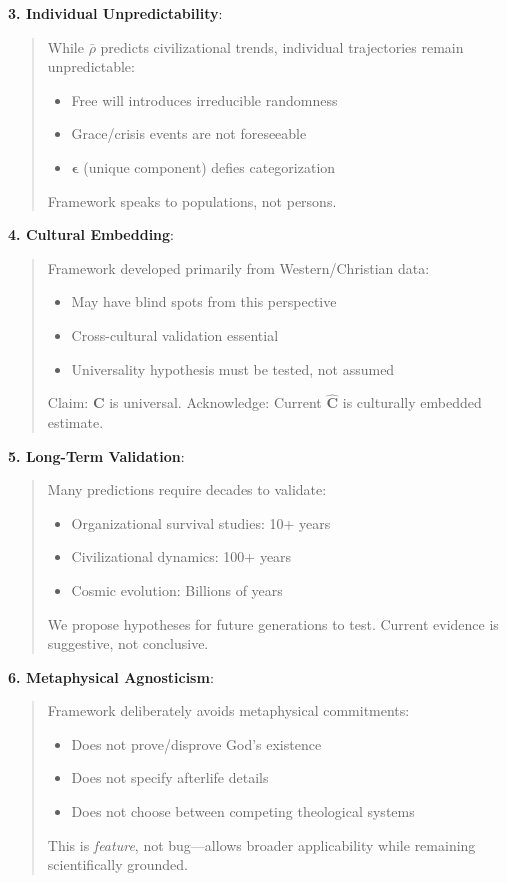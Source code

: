 \documentclass[11pt,a4paper]{article}
\theoremstyle{definition}
\theoremstyle{remark}
\begin{document}
\begin{enumerate}
\begin{protocol}
\begin{mdframed}[backgroundcolor=red!10,linewidth=2pt]
\textbf{3. Individual Unpredictability}:
\begin{quote}
While \(\bar{\rho}\) predicts civilizational trends, individual trajectories remain unpredictable:
\begin{itemize}[nosep]
    \item Free will introduces irreducible randomness
    \item Grace/crisis events are not foreseeable
    \item \(\boldsymbol{\epsilon}\) (unique component) defies categorization
\end{itemize}
Framework speaks to populations, not persons.
\end{quote}

\textbf{4. Cultural Embedding}:
\begin{quote}
Framework developed primarily from Western/Christian data:
\begin{itemize}[nosep]
    \item May have blind spots from this perspective
    \item Cross-cultural validation essential
    \item Universality hypothesis must be tested, not assumed
\end{itemize}
Claim: \(\mathbf{C}\) is universal. Acknowledge: Current \(\hat{\mathbf{C}}\) is culturally embedded estimate.
\end{quote}

\textbf{5. Long-Term Validation}:
\begin{quote}
Many predictions require decades to validate:
\begin{itemize}[nosep]
    \item Organizational survival studies: 10+ years
    \item Civilizational dynamics: 100+ years
    \item Cosmic evolution: Billions of years
\end{itemize}
We propose hypotheses for future generations to test. Current evidence is suggestive, not conclusive.
\end{quote}

\textbf{6. Metaphysical Agnosticism}:
\begin{quote}
Framework deliberately avoids metaphysical commitments:
\begin{itemize}[nosep]
    \item Does not prove/disprove God's existence
    \item Does not specify afterlife details
    \item Does not choose between competing theological systems
\end{itemize}
This is \textit{feature}, not bug—allows broader applicability while remaining scientifically grounded.
\end{quote}


\end{mdframed}
\end{protocol}
\end{enumerate}
\end{document}
